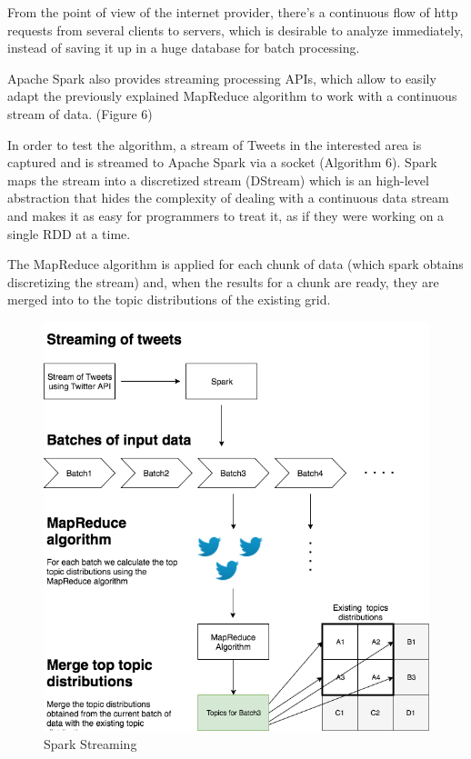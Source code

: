 From the point of view of the internet provider, there's a continuous flow of http requests from several clients to servers, which is desirable to analyze immediately, instead of saving it up in a huge database for batch processing.

Apache Spark also provides streaming processing APIs, which allow to easily adapt the previously explained MapReduce algorithm to work with a continuous stream of data. (Figure 6)

In order to test the algorithm, a stream of Tweets in the interested area is captured and is streamed to Apache Spark via a socket (Algorithm 6). Spark maps the stream into a discretized stream (DStream) which is an high-level abstraction that hides the complexity of dealing with a continuous data stream and makes it as easy for programmers to treat it, as if they were working on a single RDD at a time.

The MapReduce algorithm is applied for each chunk of data (which spark obtains discretizing the stream) and, when the results for a chunk are ready, they are merged into to the topic distributions of the existing grid.

\begin{figure}[h]
	\includegraphics[scale=0.40]{images/streamingsparkfin}
	\caption{Spark Streaming}
\end{figure}


